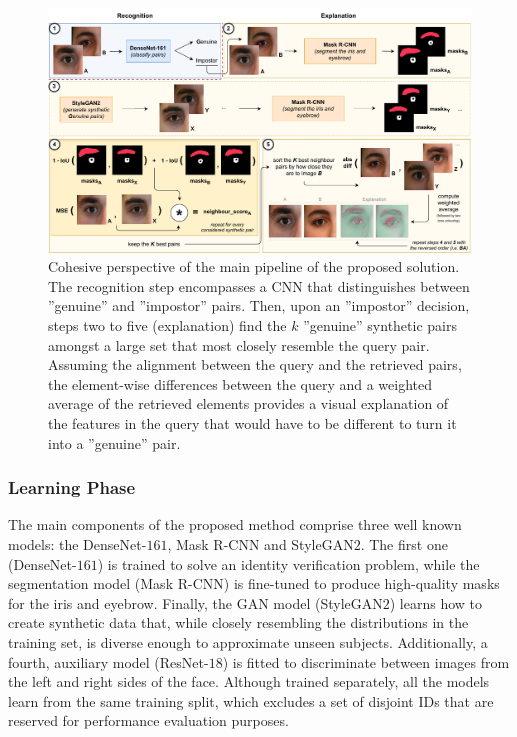 \begin{figure}[H]
\centering
\includegraphics[width=\textwidth]{figures/figure_27.pdf}
\caption{Cohesive perspective of the main pipeline of the proposed solution. The recognition step encompasses a \ac{CNN} that distinguishes between ''genuine'' and ''impostor'' pairs. Then, upon an ''impostor'' decision, steps two to five (explanation) find the $k$ ''genuine'' synthetic pairs amongst a large set that most closely resemble the query pair. Assuming the alignment between the query and the retrieved pairs, the element-wise differences between the query and a weighted average of the retrieved elements provides a visual explanation of the features in the query that would have to be different to turn it into a ''genuine'' pair.}
\label{fig:method_a_main_diagram}
\end{figure}

\subsubsection{Learning Phase}
\label{subsec:chap3_method_a_learning_phase}

The main components of the proposed method comprise three well known models: the DenseNet-$161$, Mask \ac{R-CNN} and Style\ac{GAN}$2$. The first one (DenseNet-$161$) is trained to solve an identity verification problem, while the segmentation model (Mask \ac{R-CNN}) is fine-tuned to produce high-quality masks for the iris and eyebrow. Finally, the \ac{GAN} model (Style\ac{GAN}$2$) learns how to create synthetic data that, while closely resembling the distributions in the training set, is diverse enough to approximate unseen subjects. Additionally, a fourth, auxiliary model (ResNet-$18$) is fitted to discriminate between images from the left and right sides of the face. Although trained separately, all the models learn from the same training split, which excludes a set of disjoint IDs that are reserved for performance evaluation purposes.

